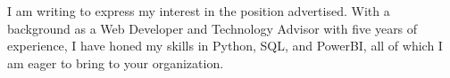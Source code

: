 
I am writing to express my interest in the \position\; position advertised. With a background as a Web Developer and Technology Advisor with five years of experience, I have honed my skills in Python, SQL, and PowerBI, all of which I am eager to bring to your organization.